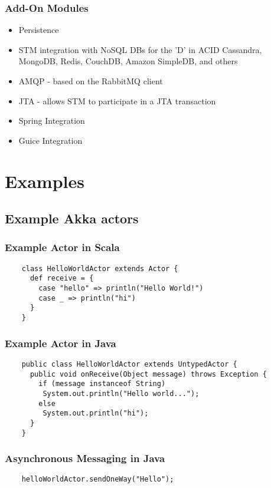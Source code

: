 \documentclass{beamer}
\begin{document}
\frame
{
  \frametitle{Add-On Modules}
  \begin{itemize}
  \item Persistence
  \item STM integration with NoSQL DBs for the 'D' in ACID
    Cassandra, MongoDB, Redis, CouchDB, Amazon SimpleDB,
    and others
  \item AMQP - based on the RabbitMQ client
  \item JTA - allows STM to participate in a JTA transaction
  \item Spring Integration
  \item Guice Integration
  \end{itemize}
}


\section{Examples}
\subsection{Example Akka actors}

\begin{frame}[fragile]
  \frametitle{Example Actor in Scala}

  \begin{lstlisting}
    class HelloWorldActor extends Actor {
      def receive = {
        case "hello" => println("Hello World!")
        case _ => println("hi")
      }
    }
  \end{lstlisting}
\end{frame}


\begin{frame}[fragile]
  \frametitle{Example Actor in Java}

  \begin{lstlisting}
    public class HelloWorldActor extends UntypedActor {
      public void onReceive(Object message) throws Exception {
        if (message instanceof String)
         System.out.println("Hello world...");
        else
         System.out.println("hi");
      }
    }
  \end{lstlisting}
\end{frame}



\begin{frame}[fragile]
  \frametitle{Asynchronous Messaging in Java}

  \begin{lstlisting}
    helloWorldActor.sendOneWay("Hello");
  \end{lstlisting}
\end{frame}
\end{document}
